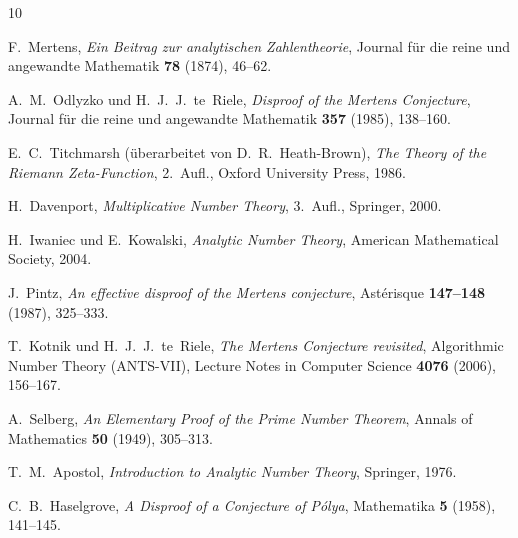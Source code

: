 \documentclass[12pt,a4paper]{amsart}
\theoremstyle{definition}
\begin{document}
\begin{thebibliography}{10}

F.~Mertens,
\textit{Ein Beitrag zur analytischen Zahlentheorie},
Journal für die reine und angewandte Mathematik \textbf{78} (1874), 46--62.

A.~M.~Odlyzko und H.~J.~J.~te~Riele,
\textit{Disproof of the Mertens Conjecture},
Journal für die reine und angewandte Mathematik \textbf{357} (1985), 138--160.

E.~C.~Titchmarsh (überarbeitet von D.~R.~Heath-Brown),
\textit{The Theory of the Riemann Zeta-Function},
2.~Aufl., Oxford University Press, 1986.

H.~Davenport,
\textit{Multiplicative Number Theory},
3.~Aufl., Springer, 2000.

H.~Iwaniec und E.~Kowalski,
\textit{Analytic Number Theory},
American Mathematical Society, 2004.

J.~Pintz,
\textit{An effective disproof of the Mertens conjecture},
Astérisque \textbf{147--148} (1987), 325--333.

T.~Kotnik und H.~J.~J.~te~Riele,
\textit{The Mertens Conjecture revisited},
Algorithmic Number Theory (ANTS-VII), Lecture Notes in Computer Science
\textbf{4076} (2006), 156--167.

A.~Selberg,
\textit{An Elementary Proof of the Prime Number Theorem},
Annals of Mathematics \textbf{50} (1949), 305--313.

T.~M.~Apostol,
\textit{Introduction to Analytic Number Theory},
Springer, 1976.

C.~B.~Haselgrove,
\textit{A Disproof of a Conjecture of Pólya},
Mathematika \textbf{5} (1958), 141--145.

\end{thebibliography}
\end{document}
